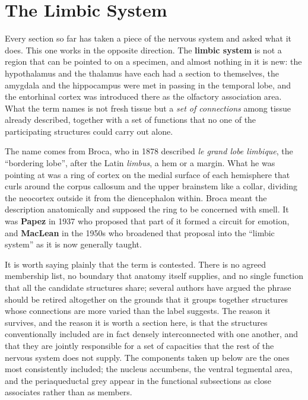 \documentclass[11pt]{article}
\begin{document}
\section{The Limbic System}

Every section so far has taken a piece of the nervous system and asked what it does. This one works in the opposite direction. The \textbf{limbic system} is not a region that can be pointed to on a specimen, and almost nothing in it is new: the hypothalamus and the thalamus have each had a section to themselves, the amygdala and the hippocampus were met in passing in the temporal lobe, and the entorhinal cortex was introduced there as the olfactory association area. What the term names is not fresh tissue but a \textit{set of connections} among tissue already described, together with a set of functions that no one of the participating structures could carry out alone.

The name comes from Broca, who in 1878 described \textit{le grand lobe limbique}, the ``bordering lobe'', after the Latin \textit{limbus}, a hem or a margin. What he was pointing at was a ring of cortex on the medial surface of each hemisphere that curls around the corpus callosum and the upper brainstem like a collar, dividing the neocortex outside it from the diencephalon within. Broca meant the description anatomically and supposed the ring to be concerned with smell. It was \textbf{Papez} in 1937 who proposed that part of it formed a circuit for emotion, and \textbf{MacLean} in the 1950s who broadened that proposal into the ``limbic system'' as it is now generally taught.

It is worth saying plainly that the term is contested. There is no agreed membership list, no boundary that anatomy itself supplies, and no single function that all the candidate structures share; several authors have argued the phrase should be retired altogether on the grounds that it groups together structures whose connections are more varied than the label suggests. The reason it survives, and the reason it is worth a section here, is that the structures conventionally included are in fact densely interconnected with one another, and that they are jointly responsible for a set of capacities that the rest of the nervous system does not supply. The components taken up below are the ones most consistently included; the nucleus accumbens, the ventral tegmental area, and the periaqueductal grey appear in the functional subsections as close associates rather than as members.
\end{document}
